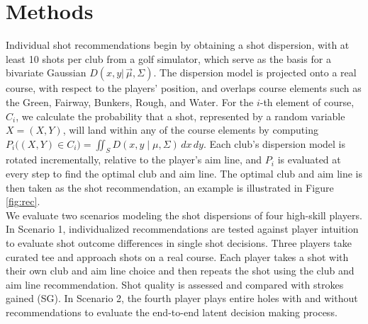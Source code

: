\documentclass[11pt,a4paper]{article}
\begin{document}
\section{Methods}
Individual shot recommendations begin by obtaining a shot dispersion, with at least 10 shots per club from a golf simulator, which serve as the basis for a bivariate Gaussian $D(x,y |\,\vec{\mu},\Sigma)$.  %
The dispersion model is projected onto a real course, with respect to the players' position, and overlaps course elements such as the Green, Fairway, Bunkers, Rough, and Water. %
For the $i$-th element of course, $C_i$,  we calculate the probability that a shot, represented by a random variable $X=(X,Y)$, will land within any of the course elements by computing $P_i\big((X,Y) \in C_i\big) = \iint_{S} D(x,y \mid \mu, \Sigma)\, dx\,dy$.  Each club's dispersion model is rotated incrementally, relative to the player's aim line, and $P_i$ is evaluated at every step to find the optimal club and aim line.  %
The optimal club and aim line is then taken as the shot recommendation, an example is illustrated in Figure \ref{fig:rec}. \\ %
We evaluate two scenarios modeling the shot dispersions of four high-skill players. %
In Scenario 1, individualized recommendations are tested against player intuition to evaluate shot outcome differences in single shot decisions. Three players take curated tee and approach shots on a real course. Each player takes a shot with their own club and aim line choice and then repeats the shot using the club and aim line recommendation. Shot quality is assessed and compared with strokes gained (SG). In Scenario 2, the fourth player plays entire holes with and without recommendations to evaluate the end-to-end latent decision making process.%
\end{document}
